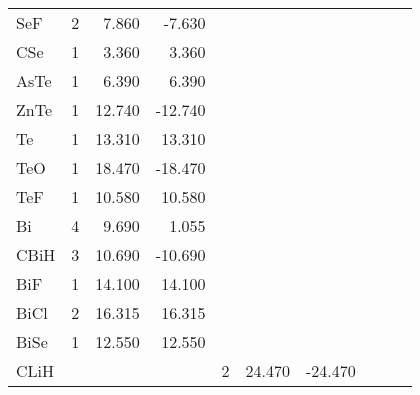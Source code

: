 \begin{table}
\begin{center}
\begin{tabular}{lrrrrrrrrr}
  SeF       &   2 &    7.860 &   -7.630 &     &          &          &     &          &          \\
  CSe       &   1 &    3.360 &    3.360 &     &          &          &     &          &          \\
  AsTe      &   1 &    6.390 &    6.390 &     &          &          &     &          &          \\
  ZnTe      &   1 &   12.740 &  -12.740 &     &          &          &     &          &          \\
  Te        &   1 &   13.310 &   13.310 &     &          &          &     &          &          \\
  TeO       &   1 &   18.470 &  -18.470 &     &          &          &     &          &          \\
  TeF       &   1 &   10.580 &   10.580 &     &          &          &     &          &          \\
  Bi        &   4 &    9.690 &    1.055 &     &          &          &     &          &          \\
  CBiH      &   3 &   10.690 &  -10.690 &     &          &          &     &          &          \\
  BiF       &   1 &   14.100 &   14.100 &     &          &          &     &          &          \\
  BiCl      &   2 &   16.315 &   16.315 &     &          &          &     &          &          \\
  BiSe      &   1 &   12.550 &   12.550 &     &          &          &     &          &          \\
  CLiH      &     &          &          &  2   &   24.470 &  -24.470 &     &          &          \\
\hline
\end{tabular}
\end{center}
\end{table}

